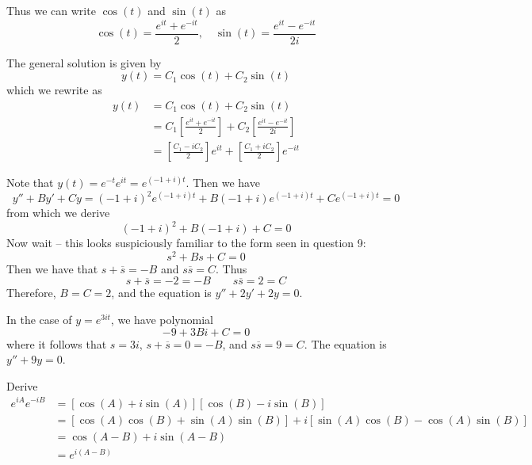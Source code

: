 \documentclass[a4paper]{article}
\begin{document}
Thus we can write \(\cos\left( t \right)\) and \(\sin\left( t \right)\) as
\[
	\cos\left( t \right) = \frac{e^{i t} + e^{-i t}}{2}, \quad \sin\left( t \right) = \frac{e^{i t} - e^{-i t}}{2i}
\]

The general solution is given by
\[
	y \!\left( t \right) = C_{1} \cos\left( t \right) + C_{2} \sin\left( t \right)
\]
which we rewrite as
\begin{align*}
	y \!\left( t \right)  & = C_{1} \cos\left( t \right) + C_{2} \sin\left( t \right) \\
	 & = C_{1} \!\left[ \frac{e^{i t} + e^{-i t}}{2} \right] + C_{2} \!\left[ \frac{e^{i t} - e^{-i t}}{2i} \right]   \\ 
	 & = \!\left[ \frac{C_{1} - iC_{2}}{2} \right] e^{i t} + \!\left[ \frac{C_{1} + iC_{2}}{2} \right] e^{-i t}
\end{align*}


Note that \(y \!\left( t \right) = e^{-t}e^{i t} = e^{\!\left( -1 + i \right) t}\). Then we have
\[
	y'' + By' + Cy = \!\left( -1 + i \right)^{2} e^{\!\left( -1 + i \right) t} + B \!\left( -1 + i \right)  e^{\!\left( -1 + i \right) t} + Ce^{\!\left( -1 + i \right) t} = 0
\]
from which we derive
\[
	\!\left( -1 + i \right)^{2} + B \!\left( -1 + i \right) + C = 0
\]
Now wait -- this looks suspiciously familiar to the form seen in question 9:
\[
	s^{2} + Bs + C = 0
\]
Then we have that \(s + \overline{s} = -B\) and \(s \overline{s} = C\). Thus
\[
	s + \overline{s} = -2 = -B \qquad s \overline{s} = 2 = C
\]
Therefore, \(B = C = 2\), and the equation is \(y'' + 2y' + 2y = 0\).

In the case of \(y = e^{3it}\), we have polynomial
\[
	-9 + 3Bi + C = 0
\]
where it follows that \(s = 3i\), \(s + \overline{s} = 0 = -B\), and \(s \overline{s} = 9 = C\). The equation is \(y'' + 9y = 0\).

\newpage


Derive
\begin{align*}
	e^{iA}e^{-iB} & = \!\left[ \cos\left( A \right) + i \sin\left( A \right) \right] \!\left[ \cos\left( B \right) - i \sin\left( B \right) \right]  \\
	 & =  \!\left[ \cos\left( A \right)\cos\left( B \right) + \sin\left( A \right) \sin\left( B \right) \right] + i \!\left[ \sin\left( A \right) \cos\left( B \right) - \cos\left( A \right) \sin\left( B \right) \right] \\ 
	 & = \cos\left( A - B \right) + i \sin\left( A - B \right) \\
	 & = e^{i \!\left( A - B \right) }
\end{align*}
\end{document}
